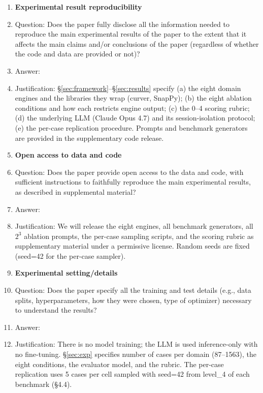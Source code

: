 \begin{enumerate}
\item {\bf Experimental result reproducibility}
    \item[] Question: Does the paper fully disclose all the information needed to reproduce the main experimental results of the paper to the extent that it affects the main claims and/or conclusions of the paper (regardless of whether the code and data are provided or not)?
    \item[] Answer: \answerYes{}
    \item[] Justification: \S\ref{sec:framework}--\S\ref{sec:results} specify (a) the eight domain engines and the libraries they wrap (curver, SnapPy); (b) the eight ablation conditions and how each restricts engine output; (c) the 0--4 scoring rubric; (d) the underlying LLM (Claude Opus 4.7) and its session-isolation protocol; (e) the per-case replication procedure. Prompts and benchmark generators are provided in the supplementary code release.

\item {\bf Open access to data and code}
    \item[] Question: Does the paper provide open access to the data and code, with sufficient instructions to faithfully reproduce the main experimental results, as described in supplemental material?
    \item[] Answer: \answerYes{}
    \item[] Justification: We will release the eight engines, all benchmark generators, all $2^3$ ablation prompts, the per-case sampling scripts, and the scoring rubric as supplementary material under a permissive license. Random seeds are fixed (seed=42 for the per-case sampler).

\item {\bf Experimental setting/details}
    \item[] Question: Does the paper specify all the training and test details (e.g., data splits, hyperparameters, how they were chosen, type of optimizer) necessary to understand the results?
    \item[] Answer: \answerYes{}
    \item[] Justification: There is no model training; the LLM is used inference-only with no fine-tuning. \S\ref{sec:exp} specifies number of cases per domain (87--1563), the eight conditions, the evaluator model, and the rubric. The per-case replication uses 5 cases per cell sampled with seed=42 from level\_4 of each benchmark (\S4.4).


\end{enumerate}
